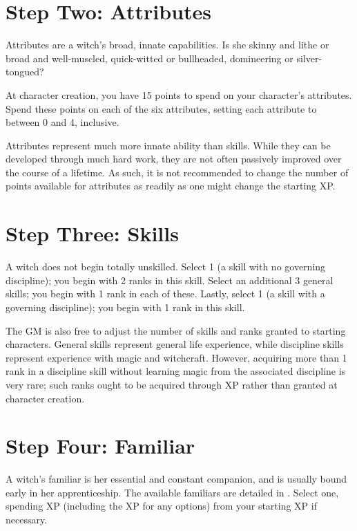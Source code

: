 \section{Step Two: Attributes}

Attributes are a witch's broad, innate capabilities.
Is she skinny and lithe or broad and well-muscled, quick-witted or bullheaded, domineering or silver-tongued?

At character creation, you have 15 points to spend on your character's attributes.
Spend these points on each of the six attributes, setting each attribute to between 0 and 4, inclusive.

Attributes represent much more innate ability than skills.
While they can be developed through much hard work, they are not often passively improved over the course of a lifetime.
As such, it is not recommended to change the number of points available for attributes as readily as one might change the starting XP.

\section{Step Three: Skills}

A witch does not begin totally unskilled.
Select 1  (a skill with no governing discipline); you begin with 2 ranks in this skill.
Select an additional 3 general skills; you begin with 1 rank in each of these.
Lastly, select 1  (a skill with a governing discipline); you begin with 1 rank in this skill.

The GM is also free to adjust the number of skills and ranks granted to starting characters.
General skills represent general life experience, while discipline skills represent experience with magic and witchcraft.
However, acquiring more than 1 rank in a discipline skill without learning magic from the associated discipline is very rare; such ranks ought to be acquired through XP rather than granted at character creation.

\section{Step Four: Familiar}

A witch's familiar is her essential and constant companion, and is usually bound early in her apprenticeship.
The available familiars are detailed in .
Select one, spending XP (including the XP for any options) from your starting XP if necessary.

